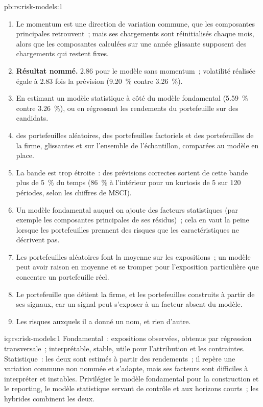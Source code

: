 \begin{solution}{pb:rs:risk-models:1}
\begin{enumerate}
\item Le momentum est une direction de variation commune, que les composantes principales retrouvent~; mais ses chargements sont réinitialisés chaque mois, alors que les composantes calculées sur une année glissante
supposent des chargements qui restent fixes.
\item \textbf{Résultat nommé.}  2.86 pour le modèle sans momentum~; volatilité réalisée égale à 2.83 fois la prévision (9.20~\% contre 3.26~\%).
\item En estimant un modèle statistique à côté du modèle fondamental (5.59~\% contre 3.26~\%), ou en régressant les rendements du portefeuille sur des  candidats.
\item {} des portefeuilles aléatoires, des portefeuilles factoriels et des portefeuilles de la firme, glissantes et sur l'ensemble de l'échantillon, comparées au modèle en place.
\item La bande est trop étroite~: des prévisions correctes sortent de cette bande plus de 5~\% du temps (86~\% à l'intérieur pour un kurtosis de 5 sur 120 périodes, selon les chiffres de MSCI).
\item Un modèle fondamental auquel on ajoute des facteurs statistiques (par exemple les composantes principales de ses résidus)~; cela en vaut la peine lorsque les portefeuilles prennent des risques que les caractéristiques
ne décrivent pas.
\item Les portefeuilles aléatoires font la moyenne sur les expositions~; un modèle peut avoir raison en moyenne et se tromper pour l'exposition particulière que concentre un portefeuille réel.
\item Le portefeuille que détient la firme, et les portefeuilles construits à partir de ses signaux, car un signal peut s'exposer à un facteur absent du modèle.
\item Les risques auxquels il a donné un nom, et rien d'autre.
\end{enumerate}
\end{solution}

\begin{solution}{iq:rs:risk-models:1}
Fondamental~: expositions observées,  obtenus par régression transversale~; interprétable, stable, utile pour l'attribution et les contraintes. Statistique~: les deux
sont estimés à partir des rendements~; il repère une variation commune non nommée et s'adapte, mais ses facteurs sont difficiles à interpréter et instables. Privilégier le modèle fondamental pour la construction et le reporting,
le modèle statistique servant de contrôle et aux horizons courts~; les hybrides combinent les deux.
\end{solution}

